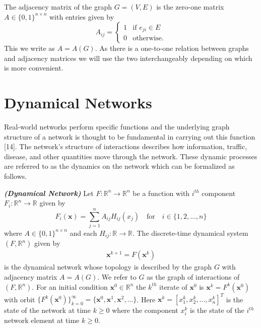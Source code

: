 \documentclass[12pt]{thesis}
\begin{document}
The adjacency matrix of the graph $G=(V,E)$ is the zero-one matrix $A\in\{0,1\}^{n\times n}$ with entries given by
\begin{equation}\label{eq:adjacencymatrix}
A_{ij} = \left\{
        \begin{array}{ll}
            1 & \text{if  }e_{ji}\in E \\
            0 & \text{otherwise}.
        \end{array}
    \right.
\end{equation}
This we write as $A=A(G)$.
As there is a one-to-one relation between graphs and adjacency
matrices we will use the two interchangeably depending on which is more convenient.

\section{Dynamical Networks}
Real-world networks perform specific functions and the underlying graph structure of a network is thought to be fundamental in carrying out this function [14].
The network's structure of interactions describes how information, traffic, disease, and other quantities move through the network.
These dynamic processes are referred to as the dynamics on the network which can be formalized as follows.

\begin{definition}\label{def:dn}{\textbf{\emph{(Dynamical Network)}}} 
Let $F:\mathbb{R}^n\rightarrow\mathbb{R}^n$ be a function with $i^{th}$ component $F_i:\mathbb{R}^n\rightarrow\mathbb{R}$ given by
\begin{equation}\label{eq:netclass}
    F_i(\mathbf{x})=\sum_{j=1}^n A_{ij}H_{ij}(x_j) \quad \text{for} \quad i\in\{1,2,\dots,n\}
\end{equation}
where $A\in\{0,1\}^{n\times n}$ and each $H_{ij}:\mathbb{R}\rightarrow\mathbb{R}$.
The discrete-time dynamical system $(F,\mathbb{R}^n)$ given by
\begin{align*}
    \mathbf{x}^{k+1}=F(\mathbf{x}^k)
\end{align*}
is the {dynamical network} whose topology is described by the graph $G$ with adjacency matrix $A=A(G)$.
We refer to $G$ as the graph of interactions of $(F,\mathbb{R}^n)$.
For an initial condition $\mathbf{x}^0\in \mathbb{R}^n$ the $k^{th}$ {iterate} of $\mathbf{x}^0$ is $\mathbf{x}^k=F^k(\mathbf{x}^0)$ with orbit $\{F^k(\mathbf{x}^0)\}_{k=0}^\infty=\{\mathbf{x}^0,\mathbf{x}^1,\mathbf{x}^2,\hdots\}$.
Here $\mathbf{x}^k=[x_1^k,x_2^k,\dots,x_n^k]^T$ is the state of the network at time $k \ge 0$ where the component $x_i^k$ is the state of the $i^{th}$ network element at time $k \ge 0$. 
\end{definition}
\end{document}

